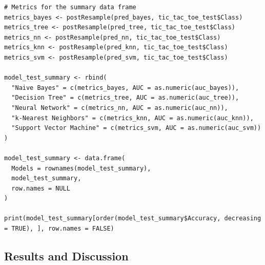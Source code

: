 \documentclass[11pt,a4paper]{article}
\begin{document}
\begin{lstlisting}
# Metrics for the summary data frame
metrics_bayes <- postResample(pred_bayes, tic_tac_toe_test$Class)
metrics_tree <- postResample(pred_tree, tic_tac_toe_test$Class)
metrics_nn <- postResample(pred_nn, tic_tac_toe_test$Class)
metrics_knn <- postResample(pred_knn, tic_tac_toe_test$Class)
metrics_svm <- postResample(pred_svm, tic_tac_toe_test$Class)

model_test_summary <- rbind(
  "Naive Bayes" = c(metrics_bayes, AUC = as.numeric(auc_bayes)),
  "Decision Tree" = c(metrics_tree, AUC = as.numeric(auc_tree)),
  "Neural Network" = c(metrics_nn, AUC = as.numeric(auc_nn)),
  "k-Nearest Neighbors" = c(metrics_knn, AUC = as.numeric(auc_knn)),
  "Support Vector Machine" = c(metrics_svm, AUC = as.numeric(auc_svm))
)

model_test_summary <- data.frame(
  Models = rownames(model_test_summary),
  model_test_summary,
  row.names = NULL
)

print(model_test_summary[order(model_test_summary$Accuracy, decreasing = TRUE), ], row.names = FALSE)
\end{lstlisting}

\subsection{Results and Discussion}
\end{document}

